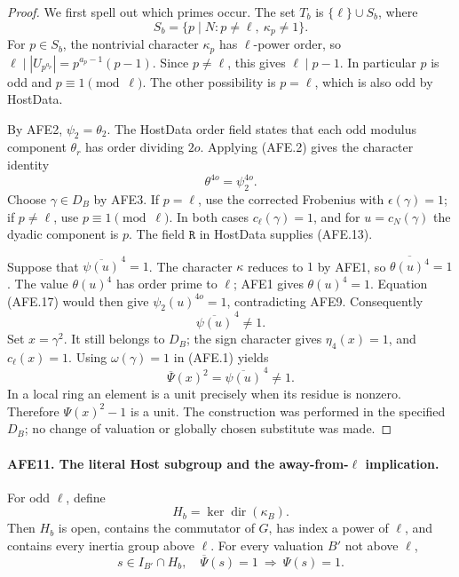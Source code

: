 \begin{proof}
We first spell out which primes occur.
The set \(T_b\) is \(\{\ell\}\cup S_b\), where
\[
 S_b=\{p\mid N:p\ne\ell,\ \kappa_p\ne1\}.
 \]
For \(p\in S_b\), the nontrivial character
\(\kappa_p\) has \(\ell\)-power order, so
\(\ell\mid |U_{p^{a_p}}|=p^{a_p-1}(p-1)\).
Since \(p\ne\ell\), this gives
\(\ell\mid p-1\).  In particular \(p\) is odd and
\(p\equiv1\pmod\ell\).
The other possibility is \(p=\ell\), which is
also odd by HostData.

By AFE2, \(\psi_2=\theta_2\).
The HostData order field states that each odd
modulus component \(\theta_r\) has order dividing
\(2o\).  Applying (AFE.2) gives the character identity
\[
                         \theta^{4o}=\psi_2^{4o}.
                                                        \tag{AFE.17}
\]
Choose \(\gamma\in D_B\) by AFE3.  If \(p=\ell\),
use the corrected Frobenius with \(\epsilon(\gamma)=1\);
if \(p\ne\ell\), use \(p\equiv1\pmod\ell\).
In both cases \(c_\ell(\gamma)=1\), and for
\(u=c_N(\gamma)\) the dyadic component is \(p\).
The field \(\texttt{R}\) in HostData supplies (AFE.13).

Suppose that \(\overline{\psi(u)}^{\,4}=1\).
The character \(\kappa\) reduces to \(1\) by AFE1,
so \(\overline{\theta(u)^4}=1\).
The value \(\theta(u)^4\) has order prime to \(\ell\);
AFE1 gives \(\theta(u)^4=1\).
Equation (AFE.17) would then give
\(\psi_2(u)^{4o}=1\), contradicting AFE9.
Consequently
\[
             \overline{\psi(u)}^{\,4}\ne1.
 \]
Set \(x=\gamma^2\).
It still belongs to \(D_B\);
the sign character gives \(\eta_4(x)=1\), and
\(c_\ell(x)=1\).
Using \(\omega(\gamma)=1\) in (AFE.1) yields
\[
            \overline\Psi(x)^2
                     =\overline{\psi(u)}^{\,4}\ne1.
 \]
In a local ring an element is a unit precisely when
its residue is nonzero.  Therefore
\(\Psi(x)^2-1\) is a unit.  The construction was
performed in the specified \(D_B\); no change of
valuation or globally chosen substitute was made.
\end{proof}

\paragraph{AFE11. The literal Host subgroup and the away-from-\(\ell\) implication.}
\label{claim:AFE11}
For odd \(\ell\), define
\[
                   H_b=\ker\operatorname{dir}(\kappa_B).
                                                        \tag{AFE.18}
\]
Then \(H_b\) is open, contains the commutator of \(G\),
has index a power of \(\ell\), and contains every
inertia group above \(\ell\).
For every valuation \(B'\) not above \(\ell\),
\[
 s\in I_{B'}\cap H_b,\quad\overline\Psi(s)=1
                         \ \Longrightarrow\ \Psi(s)=1.
                                                        \tag{AFE.19}
\]

